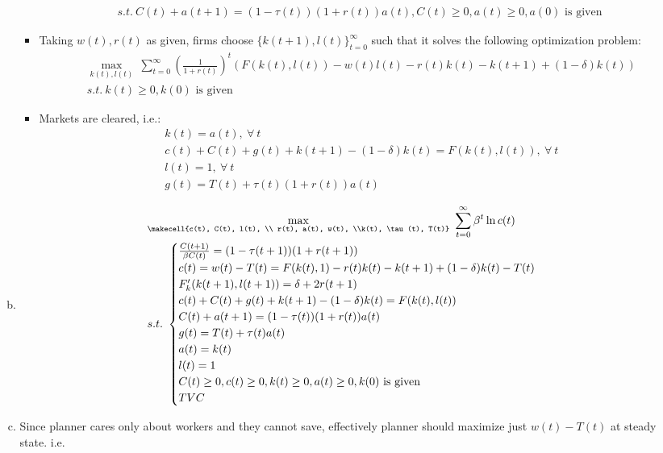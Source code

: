 \documentclass[a4paper]{article}
\begin{document}
\begin{enumerate}
\begin{enumerate}[(a)]
\begin{itemize}
\begin{align*}
		&s.t.\ C(t) + a(t+1) = (1 - \tau(t))(1 + r(t))a(t), C(t) \ge 0, a(t) \ge 0, a(0) \text{ is given }
		\end{align*}
		\item Taking $w(t), r(t)$ as given, firms choose $\{k(t+1), l(t)\}_{t=0}^{\infty}$ such that it solves the following optimization problem:
		\begin{align*}
		&\underset{k(t), l(t)}{\max}\ \sum_{t=0}^{\infty} \left(\frac{1}{1 + r(t)}\right)^t(F(k(t), l(t)) - w(t)l(t) - r(t)k(t) - k(t+1) + (1 - \delta)k(t))\\
		&s.t.\ k(t) \ge 0, k(0) \text{ is given }
		\end{align*}
		\item Markets are cleared, i.e.:
		\begin{align*}
		&k(t) = a(t),\ \forall\ t\\
		&c(t) + C(t) + g(t) + k(t+1) - (1 - \delta)k(t) = F(k(t), l(t)),\ \forall\ t\\
		&l(t) = 1,\ \forall\ t\\
		&g(t) = T(t) + \tau(t)(1 + r(t))a(t)
		\end{align*}
	\end{itemize} 
\item \begin{align*}
&\underset{\makecell{c(t), C(t), l(t), \\ r(t), a(t), w(t), \\k(t), \tau(t), T(t)}}{\max}\ \sum_{t=0}^{\infty} \beta^t \ln c(t)\\
&s.t.\ \begin{cases}
\frac{C(t+1)}{\beta C(t)} = (1 - \tau(t+1))(1 + r(t+1))\\
c(t) = w(t) - T(t) = F(k(t), 1) - r(t)k(t) - k(t+1) + (1 - \delta)k(t) - T(t)\\
F'_k(k(t+1), l(t+1)) = \delta +2r(t+1)\\
c(t) + C(t) + g(t) + k(t+1) - (1 - \delta)k(t) = F(k(t), l(t))\\
C(t) + a(t+1) = (1 - \tau(t))(1 + r(t))a(t)\\
g(t) = T(t) + \tau(t) a(t)\\
a(t) = k(t)\\
l(t) = 1\\
C(t) \ge 0, c(t) \ge 0, k(t) \ge 0, a(t) \ge 0, k(0) \text{ is given }\\
TVC
\end{cases}
\end{align*}
\item Since planner cares only about workers and they cannot save, effectively planner should maximize just $w(t) - T(t)$ at steady state. i.e.

\end{enumerate}
\end{enumerate}
\end{document}
